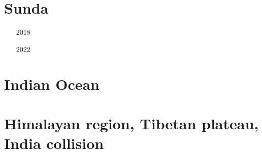 \section{Sunda}

\begin{scriptsize}
\begin{itemize}
\item[2018]
\item[2022]
\end{itemize}
\end{scriptsize}

\section{Indian Ocean} 

\begin{scriptsize}
\begin{itemize}
\item[\nineteenseventythree]
\item[\twothousandtwelve]
\item[\twothousandseventeen]
\item[\twothousandtwentytwo] 
\end{itemize}
\end{scriptsize}

\section{Himalayan region, Tibetan plateau, India collision} 

